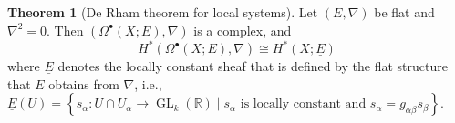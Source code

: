 \documentclass[10pt,letterpaper,cm]{nupset}
\theoremstyle{definition}
\theoremstyle{theorem}
\newtheorem{theorem}[definition]{Theorem}
\theoremstyle{remark}
\newcommand{\R}{\mathbb{R}}
\newcommand{\1}{\mathbb{1}}
\newcommand{\0}{\vec 0}
\DeclareMathOperator{\GL}{GL}
\begin{document}
\begin{theorem}[De Rham theorem for local systems]
Let $\left(E, \nabla\right)$ be flat and $\nabla^2 =0$. Then $\left(\Omega^{\bullet}(X; E), \nabla\right)$ is a complex, and $$H^{\ast}(\Omega^{\bullet}(X; E), \nabla) \cong H^{\ast}(X; \underline{E})$$ where $\underline{E}$ denotes the locally constant sheaf that is defined by the flat structure that $E$ obtains  from $\nabla$, i.e., $\underline{E}(U) = \left\{s_{\alpha} : U \cap U_{\alpha} \to \GL_k(\R) \mid s_{\alpha} \text{ is locally constant and }s_{\alpha} = g_{\alpha{\beta}}s_{\beta}\right\}$.
\end{theorem}
\end{document}
